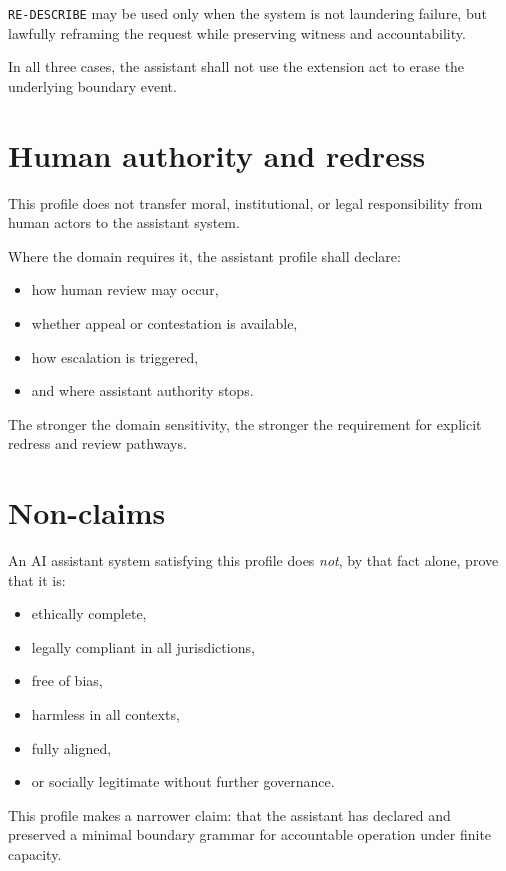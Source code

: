 \documentclass[11pt]{article}
\begin{document}
\texttt{RE-DESCRIBE} may be used only when the system is not laundering failure, but lawfully reframing the request while preserving witness and accountability.

In all three cases, the assistant shall not use the extension act to erase the underlying boundary event.

\section{Human authority and redress}

This profile does not transfer moral, institutional, or legal responsibility from human actors to the assistant system.

Where the domain requires it, the assistant profile shall declare:
\begin{itemize}[leftmargin=2em]
    \item how human review may occur,
    \item whether appeal or contestation is available,
    \item how escalation is triggered,
    \item and where assistant authority stops.
\end{itemize}

The stronger the domain sensitivity, the stronger the requirement for explicit redress and review pathways.

\section{Non-claims}

An AI assistant system satisfying this profile does \emph{not}, by that fact alone, prove that it is:
\begin{itemize}[leftmargin=2em]
    \item ethically complete,
    \item legally compliant in all jurisdictions,
    \item free of bias,
    \item harmless in all contexts,
    \item fully aligned,
    \item or socially legitimate without further governance.
\end{itemize}

This profile makes a narrower claim: that the assistant has declared and preserved a minimal boundary grammar for accountable operation under finite capacity.
\end{document}
